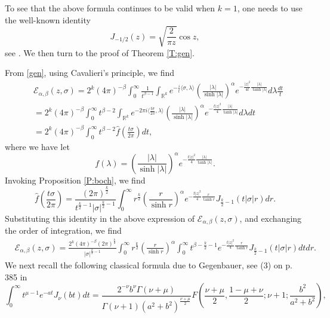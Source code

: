 \documentclass[11pt,a4paper]{amsart}
\def \R {\mathbb{R}}
\def \G{\Gamma}
\newcommand{\la}{\lambda}
\numberwithin{equation}{section}
\numberwithin{equation}{section}
\begin{document}
To see that the above formula continues to be valid when $k=1$, one needs to use the well-known identity 
\[
J_{-1/2}(z) = \sqrt{\frac{2}{\pi z}} \cos z,
\]
see \cite[(5.8.2) on p.111]{Le}. We then turn to the proof of Theorem \ref{T:gen}.

 
From \eqref{gen}, using Cavalieri's principle,  we find
\begin{align*}
& \mathscr E_{\alpha,\beta}(z,\sigma) = 2^k (4\pi)^{-\beta} \int_0^\infty \frac{1}{ t^{\beta-1}}\int_{\R^k} e^{-\frac it \langle\sigma,\la\rangle} \left(\frac{|\la|}{\sinh |\la|}\right)^{\alpha}  e^{- \frac{|z|^2}{4t} \frac{|\la|}{\tanh |\la|}}d\la\frac{dt}t
\\
& = 2^k (4\pi)^{-\beta} \int_0^\infty t^{\beta-2}\int_{\R^k} e^{-2\pi i  \langle\frac{t\sigma}{2\pi},\la\rangle} \left(\frac{|\la|}{\sinh |\la|}\right)^{\alpha}  e^{- \frac{t |z|^2}{4} \frac{|\la|}{\tanh |\la|}}d\la dt
\\
& = 2^k (4\pi)^{-\beta} \int_0^\infty t^{\beta-2} \hat f(\frac{t\sigma}{2\pi}) dt, 
\end{align*}
where we have let 
\begin{equation}\label{f}
f(\la) = \left(\frac{|\la|}{\sinh |\la|}\right)^{\alpha}  e^{- \frac{t |z|^2}{4} \frac{|\la|}{\tanh |\la|}}.
\end{equation}
Invoking Proposition \ref{P:boch}, we find
\[
\hat f(\frac{t\sigma}{2\pi}) = \frac{(2\pi)^{\frac k2}}{t^{\frac k2-1} |\sigma|^{\frac k2-1}} \int_0^\infty r^{\frac k2} \left(\frac{r}{\sinh r}\right)^{\alpha}  e^{- \frac{t |z|^2}{4} \frac{r}{\tanh r}} 
J_{\frac{k}2-1}(t |\sigma| r) dr.
\] 
Substituting this identity in the above expression of $\mathscr E_{\alpha,\beta}(z,\sigma)$, and exchanging the order of integration, we find
\begin{align}\label{E2}
& \mathscr E_{\alpha,\beta}(z,\sigma) =  \frac{2^k (4\pi)^{-\beta} (2\pi)^{\frac k2}}{|\sigma|^{\frac k2-1}} \int_0^\infty r^{\frac k2} \left(\frac{r}{\sinh r}\right)^{\alpha}  \int_0^\infty t^{\beta- \frac k2 -1} e^{- \frac{t |z|^2}{4} \frac{r}{\tanh r}} 
J_{\frac{k}2-1}(t |\sigma| r) dt dr.
\end{align}
We next recall the following classical formula due to Gegenbauer, see (3) on p. 385 in \cite{Wa}  
\begin{equation}\label{ohoh}
\int_0^\infty t^{\mu-1} e^{- a t} J_\nu(b t) dt = \frac{2^{-\nu} b^\nu \G(\nu+\mu)}{\G(\nu+1) (a^2 + b^2)^{\frac{\nu+\mu}2}} F\left(\frac{\nu+\mu}{2},\frac{1-\mu+\nu}{2};\nu+1;\frac{b^2}{a^2 + b^2}\right), 
\end{equation}
\end{document}
